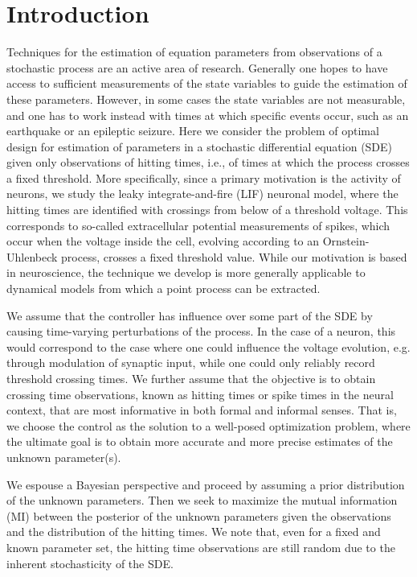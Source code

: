 \section{Introduction}
Techniques for the estimation of equation parameters from observations of a
stochastic process are an active area of research. Generally one hopes to have
access to sufficient measurements of the state variables to guide the estimation
of these parameters. However, in some cases the state variables are not
measurable, and one has to work instead with times at which specific events
occur, such as an earthquake or an epileptic seizure. Here we consider the
problem of optimal design for estimation of parameters in a stochastic
differential equation (SDE) given only observations of hitting times, i.e., of
times at which the process crosses a fixed threshold. More specifically, since a
primary motivation is the activity of neurons, we study the leaky
integrate-and-fire (LIF) neuronal model, where the hitting times are identified
with crossings from below of a threshold voltage. This corresponds to so-called
extracellular potential measurements of spikes, which occur when the voltage
inside the cell, evolving according to an Ornstein-Uhlenbeck process, crosses a
fixed threshold value. While our motivation is based in neuroscience, the
technique we develop is more generally applicable to dynamical models from which
a point process can be extracted.

We assume that the controller has influence over some part of the SDE by causing
time-varying perturbations of the process. In the case of a neuron, this would
correspond to the case where one could influence the voltage evolution, e.g.
through modulation of synaptic input, while one could only reliably record
threshold crossing times. We further assume that the objective is to obtain
crossing time observations, known as hitting times or spike times in the neural
context, that are most informative in both formal and informal senses. That is,
we choose the control as the solution to a well-posed optimization problem,
where the ultimate goal is to obtain more accurate and more precise estimates of
the unknown parameter(s).

We espouse a Bayesian perspective and proceed by assuming a prior distribution
of the unknown parameters. Then we seek to maximize the mutual information (MI)
between the posterior of the unknown parameters given the observations and the
distribution of the hitting times. We note that, even for a fixed and known
parameter set, the hitting time observations are still random due to the
inherent stochasticity of the SDE.

